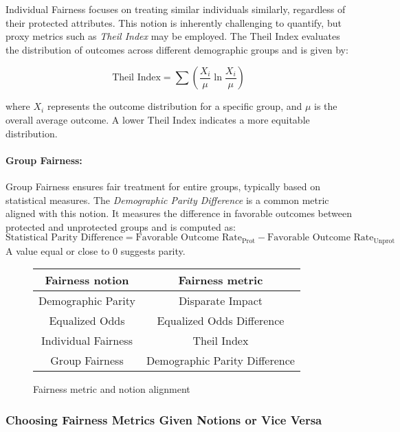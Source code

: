 Individual Fairness focuses on treating similar individuals similarly, regardless of their protected attributes. This notion is inherently challenging to quantify, but proxy metrics such as \emph{Theil Index} may be employed. The Theil Index evaluates the distribution of outcomes across different demographic groups and is given by:

\[
\text{Theil Index} = \sum \left( \frac{X_{i}}{\mu} \ln \frac{X_{i}}{\mu} \right)
\]

where \(X_{i}\) represents the outcome distribution for a specific group, and \(\mu\) is the overall average outcome. A lower Theil Index indicates a more equitable distribution.

\paragraph{Group Fairness:}

Group Fairness ensures fair treatment for entire groups, typically based on statistical measures. The \emph{Demographic Parity Difference} is a common metric aligned with this notion. It measures the difference in favorable outcomes between protected and unprotected groups and is computed as:
\[
\text{Statistical Parity Difference} = \text{Favorable Outcome Rate}_{\text{Prot}} - \text{Favorable Outcome Rate}_{\text{Unprot}}
\]
A value equal or close to 0 suggests parity.

\begin{figure}
    \centering
    \begin{tabular}{|c|c|}
        \hline
        \textbf{Fairness notion} & \textbf{Fairness metric} \\
        \hline
        Demographic Parity & Disparate Impact \\
        \hline
        Equalized Odds & Equalized Odds Difference \\
        \hline
        Individual Fairness & Theil Index \\
        \hline
        Group Fairness & Demographic Parity Difference \\
        \hline
    \end{tabular}
    \caption{Fairness metric and notion alignment}
    \label{fig:alignment}
\end{figure}

\subsubsection{Choosing Fairness Metrics Given Notions or Vice Versa}

